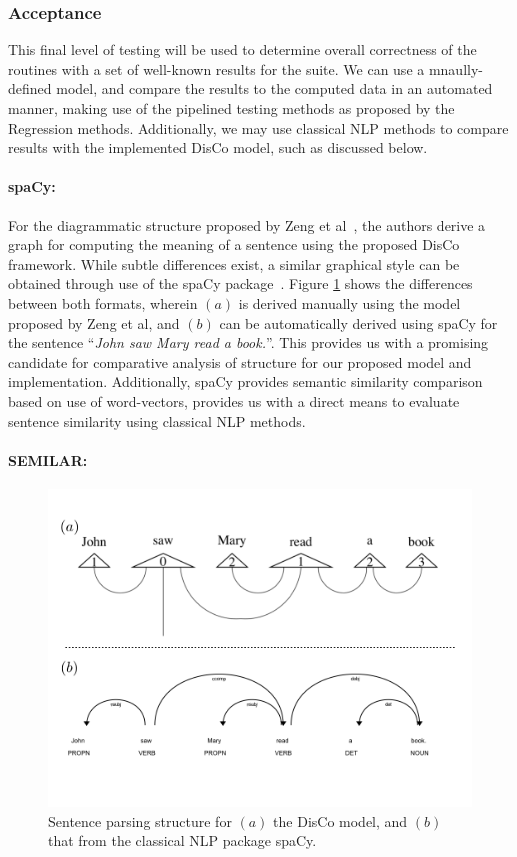 \subsubsection*{Acceptance}
This final level of testing will be used to determine overall correctness of the routines with a set of well-known results for the suite. We can use a mnaully-defined model, and compare the results to the computed data in an automated manner, making use of the pipelined testing methods as proposed by the Regression methods. Additionally, we may use classical NLP methods to compare results with the implemented DisCo model, such as discussed below.

\paragraph{spaCy:}
For the diagrammatic structure proposed by Zeng et al~\cite[Example 5.3]{DisCoWillBob}, the authors derive a graph for computing the meaning of a sentence using the proposed DisCo framework. While subtle differences exist, a similar graphical style can be obtained through use of the spaCy package~\cite{spacy2}. Figure \ref{fig:spacy_vs_disco} shows the differences between both formats, wherein $(a)$ is derived manually using the model proposed by Zeng et al, and $(b)$ can be automatically derived using spaCy for the sentence ``\textit{John saw Mary read a book.}''. This provides us with a promising candidate for comparative analysis of structure for our proposed model and implementation. Additionally, spaCy provides semantic similarity comparison based on use of word-vectors, provides us with a direct means to evaluate sentence similarity using classical NLP methods. 

\paragraph{SEMILAR:}


\begin{figure}[H]
    \centering
    \includegraphics[width=0.85\linewidth,trim=0 20px 0 20px]{D1_1/Images/spacy_vs_CSC.png}
    \caption[DisCo model versus spaCy sentence analysis.]{Sentence parsing structure for $(a)$ the DisCo model, and $(b)$ that from the classical NLP package spaCy.}
    \label{fig:spacy_vs_disco}
\end{figure}